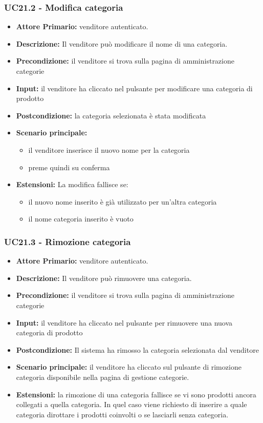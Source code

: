 \subsubsection{UC21.2 - Modifica categoria}
\label{UC21.2}
\begin{itemize}
    \item \textbf{Attore Primario:}  venditore autenticato.
    \item \textbf{Descrizione:}  Il venditore può modificare il nome di una categoria.
    \item \textbf{Precondizione:} il venditore si trova sulla pagina di amministrazione categorie
    \item \textbf{Input:} il venditore ha cliccato nel pulsante per modificare una categoria di prodotto
    \item \textbf{Postcondizione:} la categoria selezionata è stata modificata
    \item \textbf{Scenario principale:}
    \begin{itemize}
        \item il venditore inserisce il nuovo nome per la categoria
        \item preme quindi su conferma
    \end{itemize}
    \item \textbf{Estensioni:} La modifica fallisce se:
    \begin{itemize}
        \item il nuovo nome inserito è già utilizzato per un'altra categoria
        \item il nome categoria inserito è vuoto
    \end{itemize}
\end{itemize}


\subsubsection{UC21.3 - Rimozione categoria}
\label{UC21.3}
\begin{itemize}
    \item \textbf{Attore Primario:}  venditore autenticato.
    \item \textbf{Descrizione:}  Il venditore può rimuovere una categoria.
    \item \textbf{Precondizione:} il venditore si trova sulla pagina di amministrazione categorie
    \item \textbf{Input:} il venditore ha cliccato nel pulsante per rimuovere una nuova categoria di prodotto
    \item \textbf{Postcondizione:} Il sistema ha rimosso la categoria selezionata dal venditore
    \item \textbf{Scenario principale:} il venditore ha cliccato sul pulsante di rimozione categoria disponibile nella pagina di gestione categorie. 
    \item \textbf{Estensioni:} la rimozione di una categoria fallisce se vi sono prodotti ancora collegati a quella categoria. In quel caso viene richiesto
                                di inserire a quale categoria dirottare i prodotti coinvolti o se lasciarli senza categoria.
\end{itemize}


